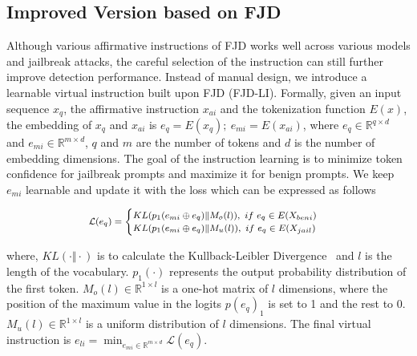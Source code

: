 \documentclass{article}
\begin{document}
\subsection{Improved Version based on FJD}\label{sec3:Variants}


Although various affirmative instructions of FJD works well across various models and jailbreak attacks, the careful selection of the instruction can still further improve detection performance. Instead of manual design, we introduce a learnable virtual instruction built upon FJD (FJD-LI). Formally, given an input sequence $ x_q $,  the affirmative instruction $x_{ai}$ and the tokenization function $E(x)$, the embedding of $ x_q $ and $x_{ai}$ is $ e_q = E(x_q);\ e_{mi}=E(x_{ai}) $, where $e_q\in \mathbb{R}^{q\times d}$ and $e_{mi}\in \mathbb{R}^{m\times d}$, $q$ and $m$ are the number of tokens and $d$ is the number of embedding dimensions. The goal of the instruction learning is to minimize token confidence for jailbreak prompts and maximize it for benign prompts. We keep $e_{mi}$ learnable and update it with the loss which can be expressed as follows

\vspace{-0.5cm}
\begin{equation*}
    \footnotesize
    \begin{split}
    \mathcal{L}(e_q) = 
    \begin{cases}
        \displaystyle KL(p_1(e_{mi}\oplus e_q) \Vert \displaystyle M_o(l)),\ if\ e_q\in E(X_{beni})\\
        \displaystyle KL(p_1(e_{mi} \oplus e_q) \Vert \displaystyle M_u(l)),\ if\ e_q\in E(X_{jail})\\
    \end{cases}    
    \end{split}
    \label{equ:loss}
\end{equation*}


where, $\displaystyle KL(\cdot \Vert \cdot)$ is to calculate the Kullback-Leibler Divergence~\citep{kullback1951information} and $l$ is the length of the vocabulary. $p_1(\cdot)$ represents the output probability distribution of the first token. $\displaystyle M_o(l)\in \mathbb{R}^{1\times l}$ is a one-hot matrix of $l$ dimensions, where the position of the maximum value in the logits $p(e_q)_1$ is set to 1 and the rest to 0. $\displaystyle M_u(l)\in \mathbb{R}^{1\times l}$ is a uniform distribution of $l$ dimensions. The final virtual instruction is $e_{li} = \min_{e_{mi}\in\mathbb{R}^{m\times d}} \mathcal{L}(e_q)$.
\end{document}

